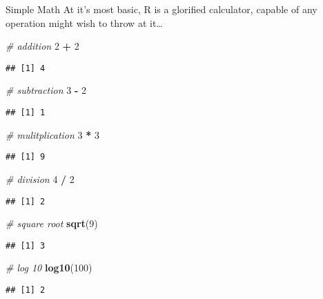 \documentclass[
  ignorenonframetext,
]{beamer}
\newenvironment{Shaded}{\begin{snugshade}}{\end{snugshade}}
\newcommand{\CommentTok}[1]{\textcolor[rgb]{0.56,0.35,0.01}{\textit{#1}}}
\newcommand{\DecValTok}[1]{\textcolor[rgb]{0.00,0.00,0.81}{#1}}
\newcommand{\FunctionTok}[1]{\textcolor[rgb]{0.13,0.29,0.53}{\textbf{#1}}}
\newcommand{\NormalTok}[1]{#1}
\newcommand{\SpecialCharTok}[1]{\textcolor[rgb]{0.81,0.36,0.00}{\textbf{#1}}}
\begin{document}
\begin{frame}[fragile]{Simple Math}
\protect\hypertarget{simple-math}{}
At it's most basic, R is a glorified calculator, capable of any
operation might wish to throw at it\ldots{}

\begin{Shaded}
\begin{Highlighting}[]
\CommentTok{\# addition}
\DecValTok{2} \SpecialCharTok{+} \DecValTok{2}
\end{Highlighting}
\end{Shaded}

\begin{verbatim}
## [1] 4
\end{verbatim}

\begin{Shaded}
\begin{Highlighting}[]
\CommentTok{\# subtraction}
\DecValTok{3} \SpecialCharTok{{-}} \DecValTok{2}
\end{Highlighting}
\end{Shaded}

\begin{verbatim}
## [1] 1
\end{verbatim}

\begin{Shaded}
\begin{Highlighting}[]
\CommentTok{\# mulitplication}
\DecValTok{3} \SpecialCharTok{*} \DecValTok{3}
\end{Highlighting}
\end{Shaded}

\begin{verbatim}
## [1] 9
\end{verbatim}

\begin{Shaded}
\begin{Highlighting}[]
\CommentTok{\# division}
\DecValTok{4} \SpecialCharTok{/} \DecValTok{2}
\end{Highlighting}
\end{Shaded}

\begin{verbatim}
## [1] 2
\end{verbatim}

\begin{Shaded}
\begin{Highlighting}[]
\CommentTok{\# square root}
\FunctionTok{sqrt}\NormalTok{(}\DecValTok{9}\NormalTok{)}
\end{Highlighting}
\end{Shaded}

\begin{verbatim}
## [1] 3
\end{verbatim}

\begin{Shaded}
\begin{Highlighting}[]
\CommentTok{\# log 10}
\FunctionTok{log10}\NormalTok{(}\DecValTok{100}\NormalTok{)}
\end{Highlighting}
\end{Shaded}

\begin{verbatim}
## [1] 2
\end{verbatim}
\end{frame}
\end{document}
